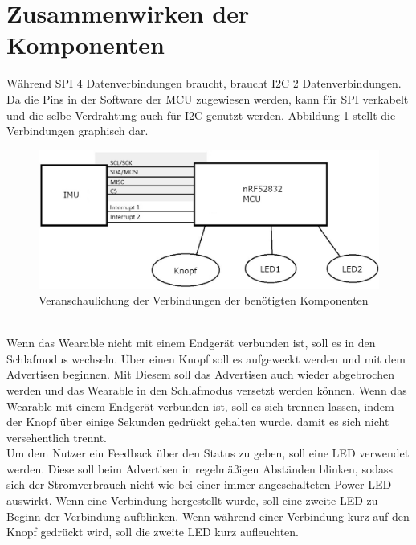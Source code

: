 \section{Zusammenwirken der Komponenten}
Während SPI 4 Datenverbindungen braucht, braucht I2C 2 Datenverbindungen.
Da die Pins in der Software der MCU zugewiesen werden, kann für SPI verkabelt und die selbe Verdrahtung auch für I2C genutzt werden.
Abbildung \ref{fig:abstract_schema} stellt die Verbindungen graphisch dar.
\begin{figure}[h]
	\centering
	\includegraphics[width=0.9\linewidth]{res/schemaAbstrakt.jpg}
	\caption{Veranschaulichung der Verbindungen der benötigten Komponenten}
	\label{fig:abstract_schema}
\end{figure}\\
Wenn das Wearable nicht mit einem Endgerät verbunden ist, soll es in den Schlafmodus wechseln.
Über einen Knopf soll es aufgeweckt werden und mit dem Advertisen beginnen.
Mit Diesem soll das Advertisen auch wieder abgebrochen werden und das Wearable in den Schlafmodus versetzt werden können.
Wenn das Wearable mit einem Endgerät verbunden ist, soll es sich trennen lassen, indem der Knopf über einige Sekunden gedrückt gehalten wurde, damit es sich nicht versehentlich trennt.\\
Um dem Nutzer ein Feedback über den Status zu geben, soll eine LED verwendet werden.
Diese soll beim Advertisen in regelmäßigen Abständen blinken, sodass sich der Stromverbrauch nicht wie bei einer immer angeschalteten Power-LED auswirkt.
Wenn eine Verbindung hergestellt wurde, soll eine zweite LED zu Beginn der Verbindung aufblinken.
Wenn während einer Verbindung kurz auf den Knopf gedrückt wird, soll die zweite LED kurz aufleuchten.

